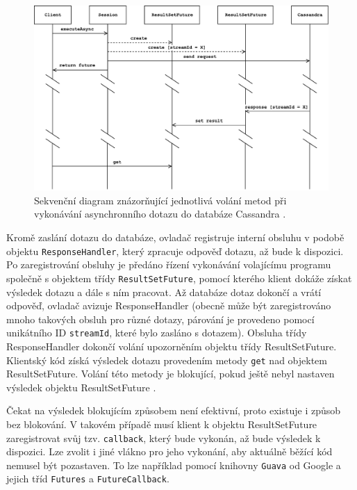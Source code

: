 \begin{figure}[!h]
  \centering
  \includegraphics[width=15cm]{template-fig/CassandraAsyncQueries.pdf}
  \caption{Sekvenční diagram znázorňující jednotlivá volání metod při vykonávání asynchronního dotazu do databáze Cassandra \cite{asyncQueriesCassandra}.}
  \label{FIG_Architecture}
\end{figure}

\noindent Kromě zaslání dotazu do databáze, ovladač registruje interní obsluhu v podobě objektu \texttt{ResponseHandler}, který zpracuje odpověď dotazu, až bude k dispozici. Po zaregistrování obsluhy je předáno řízení vykonávání volajícímu programu společně s objektem třídy \texttt{ResultSetFuture}, pomocí kterého klient dokáže získat výsledek dotazu a dále s ním pracovat.
Až databáze dotaz dokončí a vrátí odpověď, ovladač avizuje ResponseHandler (obecně může být zaregistrováno mnoho takových obsluh pro různé dotazy, párování je provedeno pomocí unikátního ID \texttt{streamId}, které bylo zasláno s dotazem). Obsluha třídy ResponseHandler dokončí volání upozorněním objektu třídy ResultSetFuture.
Klientský kód získá výsledek dotazu provedením metody \texttt{get} nad objektem ResultSetFuture. Volání této metody je blokující, pokud ještě nebyl nastaven výsledek objektu ResultSetFuture \cite{asyncQueriesCassandra}.

Čekat na výsledek blokujícím způsobem není efektivní, proto existuje i způsob bez blokování. V takovém případě musí klient k objektu ResultSetFuture zaregistrovat svůj tzv. \texttt{callback}, který bude vykonán, až bude výsledek k dispozici.
Lze zvolit i jiné vlákno pro jeho vykonání, aby aktuálně běžící kód nemusel být pozastaven. To lze například pomocí knihovny \texttt{Guava} od Google a jejich tříd \texttt{Futures} a \texttt{FutureCallback}.

